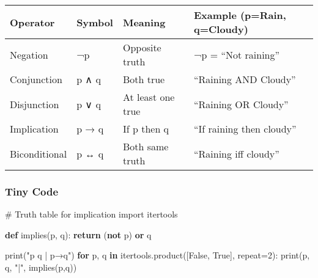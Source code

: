 \documentclass[
  letterpaper,
  DIV=11,
  numbers=noendperiod]{scrreprt}
\newenvironment{Shaded}{\begin{snugshade}}{\end{snugshade}}
\newcommand{\BuiltInTok}[1]{\textcolor[rgb]{0.00,0.23,0.31}{#1}}
\newcommand{\CommentTok}[1]{\textcolor[rgb]{0.37,0.37,0.37}{#1}}
\newcommand{\ControlFlowTok}[1]{\textcolor[rgb]{0.00,0.23,0.31}{\textbf{#1}}}
\newcommand{\DecValTok}[1]{\textcolor[rgb]{0.68,0.00,0.00}{#1}}
\newcommand{\ImportTok}[1]{\textcolor[rgb]{0.00,0.46,0.62}{#1}}
\newcommand{\KeywordTok}[1]{\textcolor[rgb]{0.00,0.23,0.31}{\textbf{#1}}}
\newcommand{\NormalTok}[1]{\textcolor[rgb]{0.00,0.23,0.31}{#1}}
\newcommand{\OperatorTok}[1]{\textcolor[rgb]{0.37,0.37,0.37}{#1}}
\newcommand{\StringTok}[1]{\textcolor[rgb]{0.13,0.47,0.30}{#1}}
\newcommand{\VariableTok}[1]{\textcolor[rgb]{0.07,0.07,0.07}{#1}}
\begin{document}
\begin{longtable}[]{@{}
  >{\raggedright\arraybackslash}p{}
  >{\raggedright\arraybackslash}p{}
  >{\raggedright\arraybackslash}p{}
  >{\raggedright\arraybackslash}p{}@{}}
\toprule\noalign{}
\begin{minipage}[b]{\linewidth}\raggedright
Operator
\end{minipage} & \begin{minipage}[b]{\linewidth}\raggedright
Symbol
\end{minipage} & \begin{minipage}[b]{\linewidth}\raggedright
Meaning
\end{minipage} & \begin{minipage}[b]{\linewidth}\raggedright
Example (p=Rain, q=Cloudy)
\end{minipage} \\
\midrule\noalign{}
\endhead
\bottomrule\noalign{}
\endlastfoot
Negation & ¬p & Opposite truth & ¬p = ``Not raining'' \\
Conjunction & p ∧ q & Both true & ``Raining AND Cloudy'' \\
Disjunction & p ∨ q & At least one true & ``Raining OR Cloudy'' \\
Implication & p → q & If p then q & ``If raining then cloudy'' \\
Biconditional & p ↔ q & Both same truth & ``Raining iff cloudy'' \\
\end{longtable}

\subsubsection{Tiny Code}\label{tiny-code-171}

\begin{Shaded}
\begin{Highlighting}[]
\CommentTok{\# Truth table for implication}
\ImportTok{import}\NormalTok{ itertools}

\KeywordTok{def}\NormalTok{ implies(p, q):}
    \ControlFlowTok{return}\NormalTok{ (}\KeywordTok{not}\NormalTok{ p) }\KeywordTok{or}\NormalTok{ q}

\BuiltInTok{print}\NormalTok{(}\StringTok{"p q | p→q"}\NormalTok{)}
\ControlFlowTok{for}\NormalTok{ p, q }\KeywordTok{in}\NormalTok{ itertools.product([}\VariableTok{False}\NormalTok{, }\VariableTok{True}\NormalTok{], repeat}\OperatorTok{=}\DecValTok{2}\NormalTok{):}
    \BuiltInTok{print}\NormalTok{(p, q, }\StringTok{"|"}\NormalTok{, implies(p,q))}
\end{Highlighting}
\end{Shaded}
\end{document}
